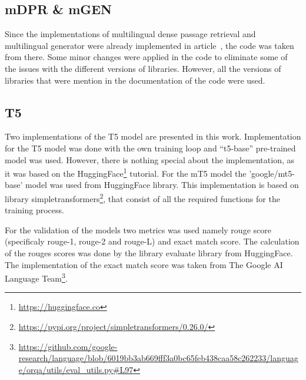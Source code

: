 \subsection{mDPR \& mGEN}
Since the implementations of multilingual dense passage retrieval and multilingual generator were already implemented in article~\cite{mDPR}, the code was taken from there. Some minor changes were applied in the code to eliminate some of the issues with the different versions of libraries. However, all the versions of libraries that were mention in the documentation of the code were used.

\subsection{T5}
Two implementations of the T5 model are presented in this work. Implementation for the T5 model was done with the own training loop and ``t5-base'' pre-trained model was used. However, there is nothing special about the implementation, as it was based on the HuggingFace\footnote{\url{https://huggingface.co}} tutorial. For the mT5 model the 'google/mt5-base' model was used from HuggingFace library. This implementation is based on library simpletransformers\footnote{\url{https://pypi.org/project/simpletransformers/0.26.0/}}, that consist of all the required functions for the training process. 

For the validation of the models two metrics was used namely rouge score (specificaly rouge-1, rouge-2 and rouge-L) and exact match score. The calculation of the rouges scores was done by the library evaluate library from HuggingFace. The implementation of the exact match score was taken from The Google AI Language Team\footnote{\url{https://github.com/google-research/language/blob/6019bb3ab669fff3a0bc65feb438caa58c262233/language/orqa/utils/eval_utils.py\#L97}}.



